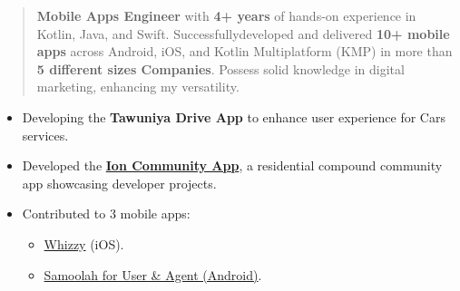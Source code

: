 \documentclass[10pt,a4paper,ragged2e,withhyper]{altacv}
\begin{document}

\makecvheader


\begin{quote}

\textbf{Mobile Apps Engineer}  with \textbf{4+ years} of hands-on experience in Kotlin, Java, and Swift.
Successfully\linebreak developed and delivered \textbf{10+ mobile apps} across Android, iOS, and Kotlin Multiplatform (KMP) in more than \textbf{5  different sizes Companies}.
  Possess solid knowledge in digital marketing, enhancing my versatility.

\end{quote}


\small\begin{itemize}
\item Developing the \textbf{Tawuniya Drive App} to enhance user experience for Cars services.
\end{itemize}
\divider

\small\begin{itemize}
\item Developed the \hyperlink{ion}{\textbf{Ion Community App}}, a residential compound community app showcasing developer projects.
\end{itemize}
\divider

\small\begin{itemize}
\item Contributed to 3 mobile apps:
\small\begin{itemize}
\item \hyperlink{whizzy}{Whizzy} (iOS).
\item \hyperlink{samoolah}{Samoolah for User \& Agent (Android)}.
\end{itemize}
\end{itemize}
\divider
\end{document}

